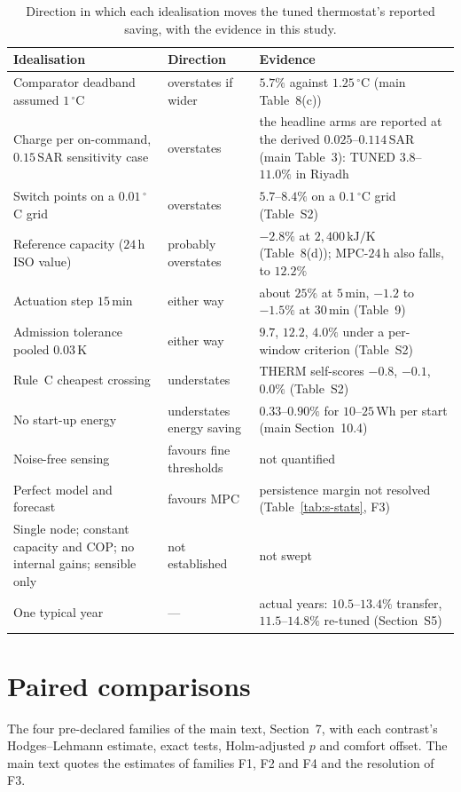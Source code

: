 \documentclass[11pt]{article}
\newcommand{\SAR}{\text{SAR}}
\begin{document}
\begin{table}[!ht]
\centering
\caption{Direction in which each idealisation moves the tuned thermostat's
reported saving, with the evidence in this study.}
\label{tab:s-bias}
\small
\begin{tabularx}{\textwidth}{@{}>{\raggedright\arraybackslash}p{}>{\raggedright\arraybackslash}p{}X@{}}
\toprule
Idealisation & Direction & Evidence \\
\midrule
Comparator deadband assumed $1\,^\circ$C & overstates if wider & $5.7\%$ against $1.25\,^\circ$C (main Table~8(c)) \\
Charge per on-command, $0.15\,\SAR$ sensitivity case & overstates & the headline arms are reported at the derived $0.025$--$0.114\,\SAR$ (main Table~3): TUNED $3.8$--$11.0\%$ in Riyadh \\
Switch points on a $0.01\,^\circ$C grid & overstates & $5.7$--$8.4\%$ on a $0.1\,^\circ$C grid (Table~S2) \\
Reference capacity ($24\,$h ISO value) & probably overstates & $-2.8\%$ at $2{,}400\,\text{kJ/K}$ (Table~8(d)); MPC-$24\,$h also falls, to $12.2\%$ \\
Actuation step $15\,$min & either way & about $25\%$ at $5\,$min, $-1.2$ to $-1.5\%$ at $30\,$min (Table~9) \\
Admission tolerance pooled $0.03\,$K & either way & $9.7$, $12.2$, $4.0\%$ under a per-window criterion (Table~S2) \\
Rule~C cheapest crossing & understates & THERM self-scores $-0.8$, $-0.1$, $0.0\%$ (Table~S2) \\
No start-up energy & understates energy saving & $0.33$--$0.90\%$ for $10$--$25\,$Wh per start (main Section~10.4) \\
Noise-free sensing & favours fine thresholds & not quantified \\
Perfect model and forecast & favours MPC & persistence margin not resolved (Table~\ref{tab:s-stats}, F3) \\
Single node; constant capacity and COP; no internal gains; sensible only & not established & not swept \\
One typical year & --- & actual years: $10.5$--$13.4\%$ transfer, $11.5$--$14.8\%$ re-tuned (Section~S5) \\
\bottomrule
\end{tabularx}
\end{table}

\section{Paired comparisons}
The four pre-declared families of the main text, Section~7, with each contrast's Hodges--Lehmann estimate, exact tests, Holm-adjusted $p$ and comfort offset. The main text quotes the estimates of families F1, F2 and F4 and the resolution of F3.
\end{document}

